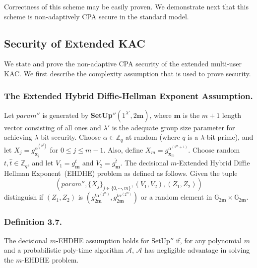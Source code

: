 \noindent Correctness of this scheme may be easily proven. We demonstrate next that this scheme is non-adaptively CPA secure in the standard model. 



\subsection{Security of Extended KAC}
\label{subsec:security1_1}

We state and prove the non-adaptive CPA security of the extended multi-user KAC. We first describe the complexity assumption that is used to prove security. 

\subsubsection{The Extended Hybrid Diffie-Hellman Exponent Assumption.} Let $param''$ is generated by \textbf{SetUp}$''(1^{\lambda'},2\mathbf{m})$, where $\mathbf{m}$ is the $m+1$ length vector consisting of all ones and $\lambda'$ is the adequate group size parameter for achieving $\lambda$ bit security. Choose $\alpha \in \mathbb{Z}_q$ at random (where $q$ is a $\lambda$-bit prime), and let $X_j=g^{\alpha^{(2^j)}}_{\mathbf{x}_j}$ for $0\leq j \leq m-1$. Also, define $X_m=g^{\alpha^{(2^m+1)}}_{\mathbf{x}_m}$. Choose random $t,\hat{t}\in\mathbb{Z}_q$, and let $V_1=g^{t}_{\mathbf{m}}$ and $V_2=g^{\hat{t}}_{\mathbf{m}}$. The decisional $m$-Extended Hybrid Diffie Hellman Exponent~(EHDHE) problem as defined as follows. Given the tuple
\begin{equation}
\left(param'',\{X_j\}_{j\in\{0,\cdots,m\}},(V_1,V_2),(Z_1,Z_2)\right)\nonumber
\end{equation}
\noindent distinguish if $(Z_1,Z_2)$ is $\left(g^{t\alpha^{(2^m)}}_{2\mathbf{m}},g^{\hat{t}\alpha^{(2^m)}}_{2\mathbf{m}}\right)$ or a random element in $\mathbb{G}_{2\mathbf{m}}\times\mathbb{G}_{2\mathbf{m}}$.\\

\subsubsection{Definition 3.7.} The decisional $m$-EHDHE assumption holds for {SetUp}$''$ if, for any polynomial $m$ and a probabilistic poly-time algorithm $\mathcal{A}$, $\mathcal{A}$ has negligible advantage in solving the $m$-EHDHE problem.\\

